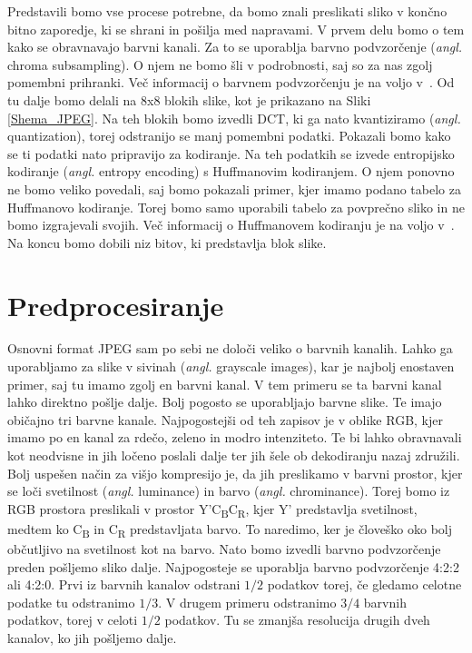 \documentclass[a4paper,12pt,openright]{book}
\begin{document}
Predstavili bomo vse procese potrebne, da bomo znali preslikati sliko v končno bitno zaporedje, ki se shrani in pošilja med napravami. V prvem delu bomo o tem kako se obravnavajo barvni kanali. Za to se uporablja barvno podvzorčenje (\textit{angl.} chroma subsampling). O njem ne bomo šli v podrobnosti, saj so za nas zgolj pomembni prihranki. Več informacij o barvnem podvzorčenju je na voljo v~\cite{chroma_subsampling}. Od tu dalje bomo delali na 8x8 blokih slike, kot je prikazano na Sliki \ref{Shema_JPEG}. Na teh blokih bomo izvedli DCT, ki ga nato kvantiziramo (\textit{angl.} quantization), torej odstranijo se manj pomembni podatki. Pokazali bomo kako se ti podatki nato pripravijo za kodiranje. Na teh podatkih se izvede entropijsko kodiranje (\textit{angl.} entropy encoding) s Huffmanovim kodiranjem. O njem ponovno ne bomo veliko povedali, saj bomo pokazali primer, kjer imamo podano tabelo za Huffmanovo kodiranje. Torej bomo samo uporabili tabelo za povprečno sliko in ne bomo izgrajevali svojih. Več informacij o Huffmanovem kodiranju je na voljo v~\cite{huffman_coding}. Na koncu bomo dobili niz bitov, ki predstavlja blok slike.

\section{Predprocesiranje}
Osnovni format JPEG sam po sebi ne določi veliko o barvnih kanalih. Lahko ga uporabljamo za slike v sivinah (\textit{angl.} grayscale images), kar je najbolj enostaven primer, saj tu imamo zgolj en barvni kanal. V tem primeru se ta barvni kanal lahko direktno pošlje dalje. Bolj pogosto se uporabljajo barvne slike. Te imajo običajno tri barvne kanale. Najpogostejši od teh zapisov je v oblike RGB, kjer imamo po en kanal za rdečo, zeleno in modro intenziteto. Te bi lahko obravnavali kot neodvisne in jih ločeno poslali dalje ter jih šele ob dekodiranju nazaj združili. Bolj uspešen način za višjo kompresijo je, da jih preslikamo v barvni prostor, kjer se loči svetilnost (\textit{angl.} luminance) in barvo (\textit{angl.} chrominance). Torej bomo iz RGB prostora preslikali v prostor Y'C\textsubscript{B}C\textsubscript{R}, kjer Y' predstavlja svetilnost, medtem ko C\textsubscript{B} in C\textsubscript{R} predstavljata barvo. To naredimo, ker je človeško oko bolj občutljivo na svetilnost kot na barvo. Nato bomo izvedli barvno podvzorčenje preden pošljemo sliko dalje. Najpogosteje se uporablja barvno podvzorčenje 4:2:2 ali 4:2:0. Prvi iz barvnih kanalov odstrani $1/2$ podatkov torej, če gledamo celotne podatke tu odstranimo $1/3$. V drugem primeru odstranimo $3/4$ barvnih podatkov, torej v celoti $1/2$ podatkov. Tu se zmanjša resolucija drugih dveh kanalov, ko jih pošljemo dalje. \par
\end{document}

